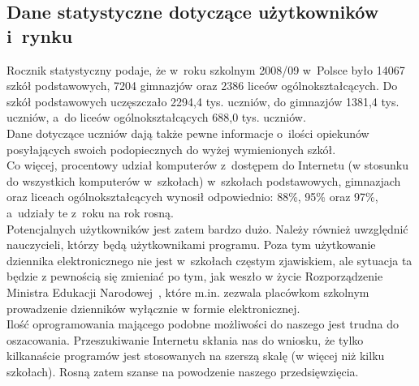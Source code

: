 \documentclass[12pt,leqno,twoside]{mwart}
\begin{document}
\subsection{Dane statystyczne dotyczące użytkowników i~rynku}
\noindent Rocznik statystyczny \cite{GUS} podaje, że w~roku szkolnym 2008/09 w~Polsce było 14067 szkół podstawowych, 7204 gimnazjów oraz 2386 liceów ogólnokształcących. Do szkół podstawowych uczęszczało 2294,4 tys. uczniów, do gimnazjów 1381,4 tys. uczniów, a~do liceów ogólnokształcących 688,0 tys. uczniów.\\
\indent Dane dotyczące uczniów dają także pewne informacje o~ilości opiekunów posyłających swoich podopiecznych do wyżej wymienionych szkół.\\
\indent Co więcej, procentowy udział komputerów z~dostępem do Internetu (w stosunku do wszystkich komputerów w~szkołach) w~szkołach podstawowych, gimnazjach oraz liceach ogólnokształcących wynosił odpowiednio: 88\%, 95\% oraz 97\%, a~udziały te z~roku na rok rosną.\\
\indent Potencjalnych użytkowników jest zatem bardzo dużo. Należy również uwzględnić nauczycieli, którzy będą użytkownikami programu. Poza tym użytkowanie dziennika elektronicznego nie jest w~szkołach częstym zjawiskiem, ale sytuacja ta będzie z pewnością się zmieniać po tym, jak weszło w życie Rozporządzenie Ministra Edukacji Narodowej~\cite{RME}, które m.in. zezwala placówkom szkolnym prowadzenie dzienników wyłącznie w formie elektronicznej. \\
\indent Ilość oprogramowania mającego podobne możliwości do naszego jest trudna do oszacowania. Przeszukiwanie Internetu skłania nas do wniosku, że tylko kilkanaście programów jest stosowanych na szerszą skalę (w więcej niż kilku szkołach). Rosną zatem szanse na powodzenie naszego przedsięwzięcia.\\
\end{document}
